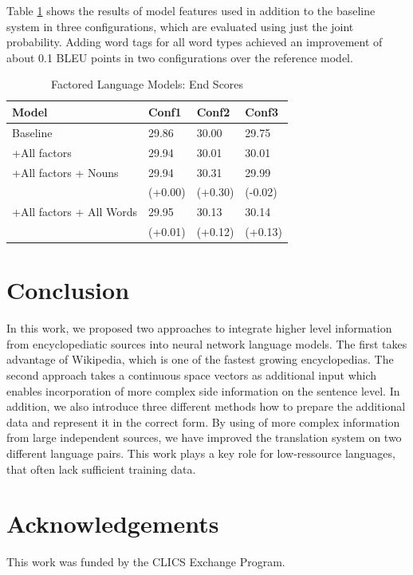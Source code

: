 \documentclass[a4paper]{article}
\begin{document}
Table \ref{tb:ro-factored-combi} shows the results of model features used in addition to the baseline system in three configurations, which are evaluated using just the joint probability. 
Adding word tags for all word types achieved an improvement of about 0.1 BLEU points in two configurations over the reference model.

\begin{table}
\caption{Factored Language Models: End Scores}
\centering
  \begin{tabular}{llll}
  	\hline
  	Model                    & Conf1   & Conf2   & Conf3   \\ \hline\hline
  	Baseline                 & 29.86   & 30.00   & 29.75   \\
  	+All factors             & 29.94   & 30.01   & 30.01   \\ \hline
  	+All factors + Nouns     & 29.94   & 30.31   & 29.99   \\
  	                         & (+0.00) & (+0.30) & (-0.02) \\
  	+All factors + All Words & 29.95   & 30.13   & 30.14   \\
  	                         & (+0.01) & (+0.12) & (+0.13)
  \end{tabular}
  \label{tb:ro-factored-combi}
\end{table}


\section{Conclusion}
In this work, we proposed two approaches to integrate higher level information from encyclopediatic sources into neural network language models. The first takes advantage of Wikipedia, which is one of the fastest growing encyclopedias. The second approach takes a continuous space vectors as additional input which enables incorporation of more complex side information on the sentence level. In addition, we  also introduce three different methods how to prepare the additional data and represent it in the correct form.
By using of more complex information from large independent sources, we have improved the translation system on two different language pairs.  
This work plays a key role for low-ressource languages, that often lack sufficient training data. 



\section{Acknowledgements}
This work was funded by the CLICS Exchange Program.
\end{document}
